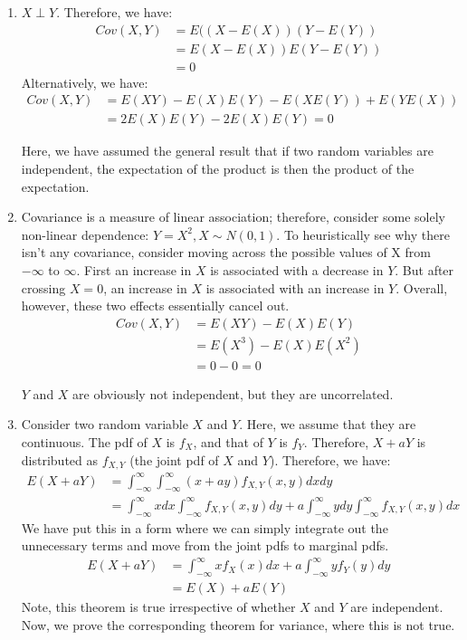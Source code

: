 \documentclass[submit]{harvardml}
\begin{document}
\begin{enumerate}[label=(\alph*)]
	\item $X \perp Y$. Therefore, we have:
		\begin{align}
			Cov(X, Y) &= E((X - E(X))(Y-E(Y)) \\
					&= E(X - E(X)) E(Y-E(Y)) \\
					&= 0
		\end{align}
		Alternatively, we have:
		\begin{align}
			Cov(X,Y) &= E(XY) - E(X)E(Y) - E(X E(Y)) + E (Y E(X)) \\
					&= 2 E(X) E(Y) - 2E(X) E(Y)  = 0
		\end{align}
		
		Here, we have assumed the general result that if two random variables are independent, the expectation of the product is then the product of the expectation.
	
	\item Covariance is a measure of linear association; therefore, consider some solely non-linear dependence: $Y = X^2, X \sim N(0,1)$. To heuristically see why there isn't any covariance, consider moving across the possible values of X from $-\infty$ to $\infty$. First an increase in $X$ is associated with a decrease in $Y$. But after crossing $X=0$, an increase in $X$ is associated with an increase in $Y$. Overall, however, these two effects essentially cancel out.
		\begin{align}
			Cov(X,Y) &= E(X Y) - E(X) E(Y) \\
					&= E(X^3) - E(X)E(X^2) \\
					&= 0 - 0 = 0
		\end{align}
		
		$Y$ and $X$ are obviously not independent, but they are uncorrelated.
		
	\item Consider two random variable $X$ and $Y$. Here, we assume that they are continuous. The pdf of $X$ is $f_X$, and that of $Y$ is $f_Y$. Therefore, $X + aY$ is distributed as $f_{X,Y}$ (the joint pdf of $X$ and $Y$). Therefore, we have:
		\begin{align}
			E(X + aY) &= \int_{-\infty}^{\infty}\int_{-\infty}^{\infty} {(x + a y) f_{X,Y} (x,y) dx dy} \\
					&=  \int_{-\infty}^{\infty}{x dx}\int_{-\infty}^{\infty}{f_{X,Y} (x,y) dy} + a \int_{-\infty}^{\infty}{y dy}\int_{-\infty}^{\infty} {f_{X,Y} (x,y) dx}
		\end{align}
		We have put this in a form where we can simply integrate out the unnecessary terms and move from the joint pdfs to marginal pdfs.
		\begin{align}
			E(X + aY) &= \int_{-\infty}^{\infty}{x f_X (x) dx} + a \int_{-\infty}^{\infty}{y f_Y (y) dy} \\
						&= E(X) + a E(Y)
		\end{align}
		Note, this theorem is true irrespective of whether $X$ and $Y$ are independent. Now, we prove the corresponding theorem for variance, where this is not true.
		

\end{enumerate}
\end{document}
